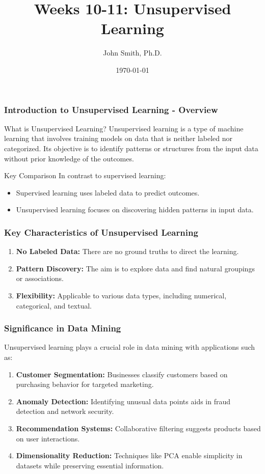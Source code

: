 \documentclass[aspectratio=169]{beamer}
\title[Weeks 10-11: Unsupervised Learning]{Weeks 10-11: Unsupervised Learning}
\author[J. Smith]{John Smith, Ph.D.}
\institute[University Name]{
  Department of Computer Science\\
  University Name\\
  \vspace{0.3cm}
  Email: email@university.edu\\
  Website: www.university.edu
}
\date{\today}
\begin{document}
\frame{\titlepage}

\begin{frame}[fragile]
    \titlepage
\end{frame}

\begin{frame}[fragile]
    \frametitle{Introduction to Unsupervised Learning - Overview}
    \begin{block}{What is Unsupervised Learning?}
        Unsupervised learning is a type of machine learning that involves training models on data that is neither labeled nor categorized. 
        Its objective is to identify patterns or structures from the input data without prior knowledge of the outcomes.
    \end{block}
    \begin{block}{Key Comparison}
        In contrast to supervised learning:
        \begin{itemize}
            \item Supervised learning uses labeled data to predict outcomes.
            \item Unsupervised learning focuses on discovering hidden patterns in input data.
        \end{itemize}
    \end{block}
\end{frame}

\begin{frame}[fragile]
    \frametitle{Key Characteristics of Unsupervised Learning}
    \begin{enumerate}
        \item \textbf{No Labeled Data:} There are no ground truths to direct the learning.
        \item \textbf{Pattern Discovery:} The aim is to explore data and find natural groupings or associations.
        \item \textbf{Flexibility:} Applicable to various data types, including numerical, categorical, and textual.
    \end{enumerate}
\end{frame}

\begin{frame}[fragile]
    \frametitle{Significance in Data Mining}
    Unsupervised learning plays a crucial role in data mining with applications such as:
    \begin{enumerate}
        \item \textbf{Customer Segmentation:} 
            Businesses classify customers based on purchasing behavior for targeted marketing.
        \item \textbf{Anomaly Detection:} 
            Identifying unusual data points aids in fraud detection and network security.
        \item \textbf{Recommendation Systems:} 
            Collaborative filtering suggests products based on user interactions.
        \item \textbf{Dimensionality Reduction:} 
            Techniques like PCA enable simplicity in datasets while preserving essential information.
    \end{enumerate}
\end{frame}
\end{document}
